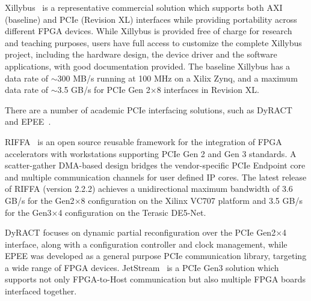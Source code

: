 Xillybus~\cite{xillybus2018} is a representative commercial solution which supports both AXI (baseline) and PCIe (Revision XL) interfaces while providing portability across different FPGA devices. 
While Xillybus is provided free of charge for research and teaching purposes, users have full access to customize the complete Xillybus project, including the hardware design, the device driver and the software applications, with good documentation provided. 
The baseline Xillybus has a data rate of $\sim$300 MB/s running at 100 MHz on a Xilix Zynq, and a maximum data rate of $\sim$3.5 GB/s for PCIe Gen 2$\times$8 interfaces in Revision XL.

There are a number of academic PCIe interfacing solutions, such as DyRACT~\cite{vipin2014dyract} and EPEE~\cite{gong2014efficient}.

RIFFA~\cite{jacobsen2015riffa} is an open source reusable framework for the integration of FPGA accelerators with workstations supporting PCIe Gen 2 and Gen 3 standards. 
A scatter-gather DMA-based design bridges the vendor-specific PCIe Endpoint core and multiple communication channels for user defined IP cores. 
The latest release of RIFFA (version 2.2.2) achieves a unidirectional maximum bandwidth of 3.6 GB/s for the Gen2$\times$8 configuration on the Xilinx VC707 platform and 3.5 GB/s for the Gen3$\times$4 configuration on the Terasic DE5-Net.

DyRACT focuses on dynamic partial reconfiguration over the PCIe Gen2$\times$4 interface, along with a configuration controller and clock management, while EPEE was developed as a general purpose PCIe communication library, targeting a wide range of FPGA devices.
JetStream~\cite{vesper2016jetstream} is a PCIe Gen3 solution which supports not only FPGA-to-Host communication but also multiple FPGA boards interfaced together. 



